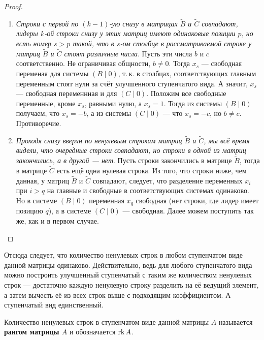 \begin{proof}
\begin{enumerate}
        \item \textit{Строки с первой по $(k - 1)$-ую снизу в матрицах $\widetilde{B}$ и $\widetilde{C}$ совпадают, лидеры $k$-ой строки снизу у этих матриц имеют одинаковые позиции $p$, но есть номер $s > p$ такой, что в $s$-ом столбце в рассматриваемой строке у матриц $\widetilde{B}$ и $\widetilde{C}$ стоят различные числа}. Пусть эти числа $b$ и $c$ соответственно. Не ограничивая общности, $b \ne 0$. Тогда $x_s$ --- свободная переменая для системы $(B \mid 0)$, т.\,к. в столбцах, соответствующих главным переменным стоят нули за счёт улучшенного ступенчатого вида. А значит, $x_s$ --- свободная переменнная и для $(C \mid 0)$. Положим все свободные переменные, кроме $x_s$, равными нулю, а $x_s = 1$. Тогда из системы $(B \mid 0)$ получаем, что $x_s = -b$, а из системы $(C \mid 0)$ --- что $x_s = -c$, но $b \ne c$. Противоречие.
        \item \textit{Проходя снизу вверхн по ненулевым строкам матриц $\widetilde{B}$ и $\widetilde{C}$, мы всё время видели, что очередные строки совпадают, но строки в одной из матриц закончились, а в другой --- нет}. Пусть строки закончились в матрице $\widetilde{B}$, тогда в матрице $\widetilde{C}$ есть ещё одна нулевая строка. Из того, что строки ниже, чем данная, у матриц $\widetilde{B}$ и $\widetilde{C}$ совпадают, следует, что разделение переменных $x_i$ при $i > q$ на главные и свободные в соответствующих системах одинаково. Но в системе $(B \mid 0)$ переменная $x_q$ свободная (нет строки, где лидер имеет позицию $q$), а в системе $(C \mid 0)$ --- свободная. Далее можем поступить так же, как и в первом случае.
    \end{enumerate}
\end{proof}

\begin{remark}
    Отсюда следует, что количество ненулевых строк в любом ступенчатом виде данной матрицы одинаково. Действительно, ведь для любого ступенчатого вида можно построить улучшенный ступенчатый с таким же количеством ненулевых строк --- достаточно каждую ненулевую строку разделить на её ведущий элемент, а затем вычесть её из всех строк выше с подходящим коэффициентом. А ступенчатый вид единственный.
\end{remark}

\begin{definition}
    Количество ненулевых строк в ступенчатом виде данной матрицы $A$ называется \textbf{рангом матрицы $A$} и обозначается $\mathrm{rk}\, A$.
\end{definition}

